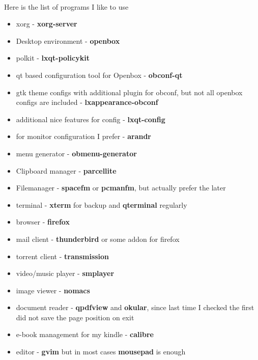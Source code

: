 \documentclass[11pt,a4paper]{article}
\begin{document}
                    \paragraph{} Here is the list of programs I like to use
                    \begin{itemize}
                        \item xorg - \textbf{xorg-server}
                        \item Desktop environment - \textbf{openbox}
                        \item polkit - \textbf{lxqt-policykit}
                        \item qt based configuration tool for Openbox - \textbf{obconf-qt}
                        \item gtk theme configs with additional plugin for obconf, but not all openbox configs are included - \textbf{lxappearance-obconf}
                        \item additional nice features for config - \textbf{lxqt-config}
                        \item for monitor configuration I prefer - \textbf{arandr}
                        \item menu generator - \textbf{obmenu-generator}
                        \item Clipboard manager - \textbf{parcellite}
                        \item Filemanager - \textbf{spacefm} or \textbf{pcmanfm}, but actually prefer the later
                        \item terminal - \textbf{xterm} for backup and \textbf{qterminal} regularly
                        \item browser - \textbf{firefox}
                        \item mail client - \textbf{thunderbird} or some addon for firefox
                        \item torrent client - \textbf{transmission}
                        \item video/music player - \textbf{smplayer}
                        \item image viewer - \textbf{nomacs}
                        \item document reader - \textbf{qpdfview} and \textbf{okular}, since last time I checked the first did not save the page position on exit
                        \item e-book management for my kindle - \textbf{calibre}
                        \item editor - \textbf{gvim} but in most cases \textbf{mousepad} is enough

\end{itemize}
\end{document}
